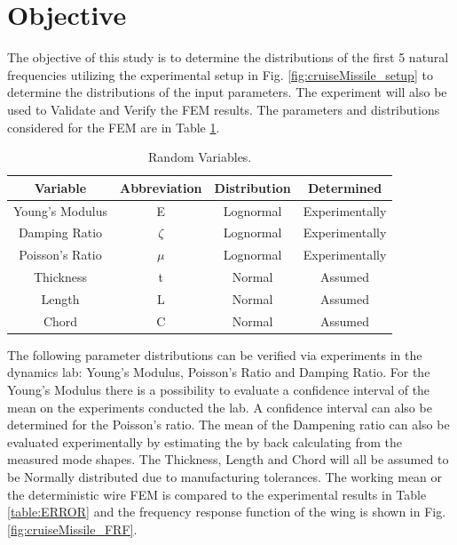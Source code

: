 \documentclass[paper=a4, fontsize=12pt]{scrartcl} %
\begin{document}
\section*{Objective}
The objective of this study is to determine the distributions of the first 5 natural frequencies utilizing the experimental setup in Fig. \ref{fig:cruiseMissile_setup} to determine the distributions of the input parameters. The experiment will also be used to Validate and Verify the FEM results. The parameters and distributions considered for the FEM are in Table \ref{table:RV}. 
%
\begin{table}[H]
\centering
\caption{Random Variables.}
\begin{tabular}{| c | c | c | c |}
\hline
		Variable & Abbreviation & Distribution & Determined \\ \hline
		\hline
		Young's Modulus & E & Lognormal & Experimentally \\ \hline
		Damping Ratio & $\zeta$ &  Lognormal & Experimentally  \\ \hline
		Poisson's Ratio & $\mu$ & Lognormal & Experimentally \\ \hline
		Thickness  & t & Normal  & Assumed \\ \hline
		Length & L  &  Normal  & Assumed \\ \hline
		Chord  & C & Normal  & Assumed \\ \hline
\end{tabular}
\label{table:RV}
\end{table}
%
The following parameter distributions can be verified via experiments in the dynamics lab: Young's Modulus, Poisson's Ratio and Damping Ratio. For the Young's Modulus there is a possibility to evaluate a confidence interval of the mean on the experiments conducted the lab. A confidence interval can also be determined for the Poisson's ratio. The mean of the Dampening ratio can also be evaluated experimentally by estimating the by back calculating from the measured mode shapes. The Thickness, Length and Chord will all be assumed to be Normally distributed due to manufacturing tolerances. The working mean or the deterministic wire FEM is compared to the experimental results in Table \ref{table:ERROR} and the frequency response function of the wing is shown in Fig. \ref{fig:cruiseMissile_FRF}.
%
\end{document}
